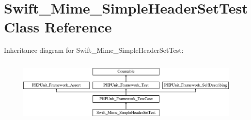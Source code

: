 \section{Swift\+\_\+\+Mime\+\_\+\+Simple\+Header\+Set\+Test Class Reference}
\label{class_swift___mime___simple_header_set_test}
Inheritance diagram for Swift\+\_\+\+Mime\+\_\+\+Simple\+Header\+Set\+Test\+:\begin{figure}[H]
\begin{center}
\leavevmode
\includegraphics[height=3.303835cm]{class_swift___mime___simple_header_set_test}
\end{center}
\end{figure}
